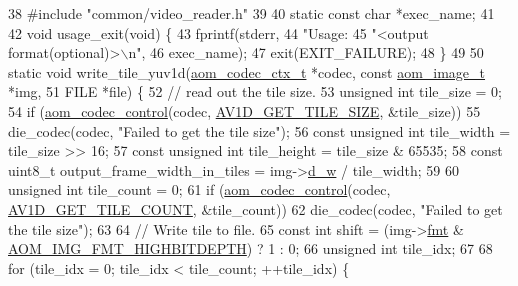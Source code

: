 \begin{DoxyCodeInclude}
38 \textcolor{preprocessor}{#include "common/video\_reader.h"}
39 
40 \textcolor{keyword}{static} \textcolor{keyword}{const} \textcolor{keywordtype}{char} *exec\_name;
41 
42 \textcolor{keywordtype}{void} usage\_exit(\textcolor{keywordtype}{void}) \{
43   fprintf(stderr,
44           \textcolor{stringliteral}{"Usage: %
45           \textcolor{stringliteral}{"<output format(optional)>\(\backslash\)n"},
46           exec\_name);
47   exit(EXIT\_FAILURE);
48 \}
49 
50 \textcolor{keyword}{static} \textcolor{keywordtype}{void} write\_tile\_yuv1d(\hyperlink{structaom__codec__ctx}{aom\_codec\_ctx\_t} *codec, \textcolor{keyword}{const} 
      \hyperlink{structaom__image}{aom\_image\_t} *img,
51                              FILE *file) \{
52   \textcolor{comment}{// read out the tile size.}
53   \textcolor{keywordtype}{unsigned} \textcolor{keywordtype}{int} tile\_size = 0;
54   \textcolor{keywordflow}{if} (\hyperlink{group__codec_ga6da974f4eeaba1fa74106b28d0fe6ac5}{aom\_codec\_control}(codec, \hyperlink{group__aom__decoder_gga3865fd4b3192489baa9a5c3632ebe97ba4d9799d9e520785870b8d1f73a19c3c4}{AV1D\_GET\_TILE\_SIZE}, &tile\_size))
55     die\_codec(codec, \textcolor{stringliteral}{"Failed to get the tile size"});
56   \textcolor{keyword}{const} \textcolor{keywordtype}{unsigned} \textcolor{keywordtype}{int} tile\_width = tile\_size >> 16;
57   \textcolor{keyword}{const} \textcolor{keywordtype}{unsigned} \textcolor{keywordtype}{int} tile\_height = tile\_size & 65535;
58   \textcolor{keyword}{const} uint8\_t output\_frame\_width\_in\_tiles = img->\hyperlink{structaom__image_a89f80b1f58d608b9d2080635f4359034}{d\_w} / tile\_width;
59 
60   \textcolor{keywordtype}{unsigned} \textcolor{keywordtype}{int} tile\_count = 0;
61   \textcolor{keywordflow}{if} (\hyperlink{group__codec_ga6da974f4eeaba1fa74106b28d0fe6ac5}{aom\_codec\_control}(codec, \hyperlink{group__aom__decoder_gga3865fd4b3192489baa9a5c3632ebe97ba242d7dba47ef646f51f9795e2fa92f91}{AV1D\_GET\_TILE\_COUNT}, &tile\_count))
62     die\_codec(codec, \textcolor{stringliteral}{"Failed to get the tile size"});
63 
64   \textcolor{comment}{// Write tile to file.}
65   \textcolor{keyword}{const} \textcolor{keywordtype}{int} shift = (img->\hyperlink{structaom__image_a6c64b1ab918d80d52eb8f5d6d957e825}{fmt} & \hyperlink{aom__image_8h_a607b37d91f75442f54223ecd85f1b6cb}{AOM\_IMG\_FMT\_HIGHBITDEPTH}) ? 1 : 0;
66   \textcolor{keywordtype}{unsigned} \textcolor{keywordtype}{int} tile\_idx;
67 
68   \textcolor{keywordflow}{for} (tile\_idx = 0; tile\_idx < tile\_count; ++tile\_idx) \{
}
\end{DoxyCodeInclude}

